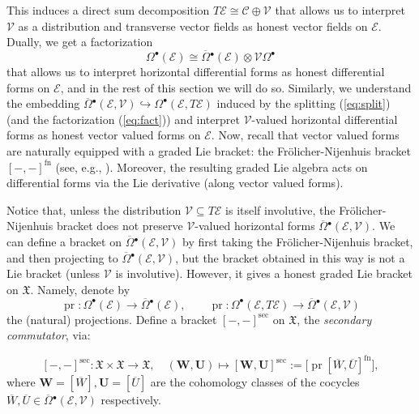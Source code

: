 \documentclass{conm-p-l}
\theoremstyle{definition}
\theoremstyle{remark}
\numberwithin{equation}{section}
\begin{document}
\vspace{10pt}
\noindent This induces a direct sum decomposition $T\mathscr E \cong \mathscr C \oplus \mathscr V$ that allows us to interpret $\mathscr V$ as a distribution and transverse vector fields as honest vector fields on $\mathscr E$. Dually, we get a factorization
\begin{equation}\label{eq:fact}
\Omega^\bullet (\mathscr E) \cong \overline \Omega{}^{\bullet} (\mathscr E) \otimes \mathscr V \Omega^\bullet
\end{equation}
that allows us to interpret horizontal differential forms as honest differential forms on $\mathscr E$, and in the rest of this section we will do so.  Similarly, we understand the embedding $\overline \Omega{}^\bullet (\mathscr E, \mathscr V) \hookrightarrow \Omega^\bullet (\mathscr E, T\mathscr E)$ induced by the splitting (\ref{eq:split}) (and the factorization (\ref{eq:fact})) and interpret $\mathscr V$-valued horizontal differential forms as honest vector valued forms on $\mathscr E$.    Now, recall that vector valued forms are naturally equipped with a graded Lie bracket: the Fr\"olicher-Nijenhuis bracket $[-,-]^{\mathrm{fn}}$ (see, e.g., \cite[Section 16]{m08}). Moreover, the resulting graded Lie algebra acts on differential forms via the Lie derivative (along vector valued forms). 

Notice that, unless the distribution $\mathscr V \subseteq T \mathscr E$ is itself involutive, the Fr\"olicher-Nijenhuis bracket does not preserve $\mathscr V$-valued horizontal forms $\overline \Omega{}^\bullet (\mathscr E, \mathscr V) $. We can define a bracket on $\overline \Omega{}^\bullet (\mathscr E, \mathscr V)$ by first taking the Fr\"olicher-Nijenhuis bracket, and then projecting to $\overline \Omega{}^\bullet (\mathscr E, \mathscr V)$, but the bracket obtained in this way is not a Lie bracket (unless $\mathscr V$ is involutive). However, it gives a honest graded Lie bracket on $\boldsymbol{\mathfrak X}$. Namely, denote by
\[
\operatorname{pr} : \Omega^\bullet (\mathscr E) \to \overline \Omega{}^\bullet (\mathscr E), \quad\quad \operatorname{pr} : \Omega^\bullet (\mathscr E , T \mathscr E) \to \overline \Omega{}^\bullet (\mathscr E, \mathscr V)
\]
the (natural) projections. Define a bracket $[-,-]^{\mathrm{sec}}$ on $\boldsymbol{\mathfrak X}$, the \emph{secondary commutator}, via:

\begin{equation}\label{eq:sec_Lie_bra}
[-,-]^{\mathrm{sec}} : \boldsymbol{\mathfrak X} \times \boldsymbol{\mathfrak X} \to \boldsymbol{\mathfrak X}, \quad \left(\boldsymbol W, \boldsymbol U \right) \mapsto \left[ \boldsymbol W, \boldsymbol U \right]^{\mathrm{sec}} := \big[\operatorname{pr}[\overline W, \overline U]^{\mathrm{fn}}\big],
\end{equation}
where $\boldsymbol W = [\overline W], \boldsymbol U = [\overline U]$ are the cohomology classes of the cocycles $\overline W, \overline U \in \overline \Omega{}^\bullet (\mathscr E, \mathscr V)$ respectively.
\end{document}
